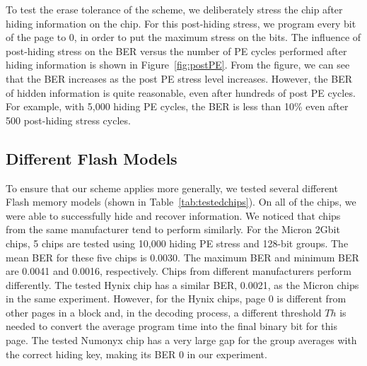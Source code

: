 To test the erase tolerance of the scheme, we
deliberately stress the chip after hiding information on the chip. 
For this post-hiding stress, we program every bit of the page
to 0, in order to put the maximum stress on the bits.
The influence of post-hiding stress on the BER versus 
the number of PE cycles performed after hiding information
is shown in
Figure~\ref{fig:postPE}. From
the figure, we can see that the BER increases as the post PE
stress level increases. However, the BER of hidden information is quite
reasonable, even after hundreds of post PE cycles. For example, with 5,000 hiding PE
cycles, the BER is less than 10\% even after 500 post-hiding stress cycles.


\subsection{Different Flash Models}

To ensure that our scheme applies more generally, we tested
several different Flash memory models (shown in Table~\ref{tab:testedchips}).
On all of the chips, we were able to successfully hide and recover information.
We noticed that chips from the same manufacturer 
tend to perform similarly. For the Micron 2Gbit chips, 5
chips are tested using 10,000 hiding PE stress and 128-bit
groups. The mean BER for these five chips is 0.0030. The maximum
BER and minimum BER are 0.0041 and 0.0016, respectively. Chips
from different manufacturers perform differently. The tested Hynix
chip has a similar BER, 0.0021, as the Micron chips in the same
experiment. However, for the Hynix chips, page 0 is
different from other pages in a block and, in the decoding process, 
a different threshold $Th$ is needed 
to convert the average program time into 
the final binary bit for this page.
The tested Numonyx chip has a very large
gap for the group averages with the correct hiding key, making
its BER 0 in our experiment.

